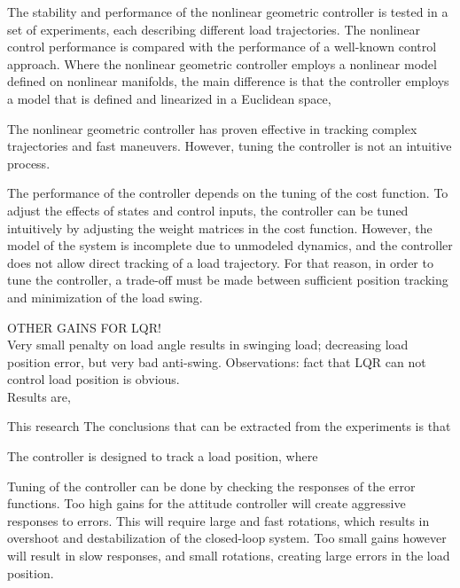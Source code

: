 The stability and performance of the nonlinear geometric controller is tested in a set of experiments, each describing different load trajectories. 
The nonlinear control performance is compared with the performance of a well-known  control approach. 
Where the nonlinear geometric controller employs a nonlinear model defined on nonlinear manifolds,
the main difference is that the  controller employs a model that is defined and linearized in a Euclidean space, 

%

The nonlinear geometric controller has proven effective in tracking complex trajectories and fast maneuvers.
However, tuning the controller is not an intuitive process. 

The performance of the  controller depends on the tuning of the cost function. 
To adjust the effects of states and control inputs, the controller can be tuned intuitively by adjusting the weight matrices in the cost function.
However, the model of the system is incomplete due to unmodeled dynamics, and the controller does not allow direct tracking of a load trajectory.
For that reason, in order to tune the  controller, a trade-off must be made between sufficient  position tracking and minimization of the load swing. 






OTHER GAINS FOR LQR!\\
Very small penalty on load angle results in swinging load; decreasing load position error, but very bad anti-swing. 
Observations: fact that LQR can not control load position is obvious.\\

Results are,

This research 
The conclusions that can be extracted from the experiments is that 

The  controller is designed to track a load position, where 

Tuning of the controller can be done by checking the responses of the error functions.
Too high gains for the  attitude controller will create aggressive responses to errors. 
This will require large and fast rotations, which results in overshoot and destabilization of the closed-loop system.
Too small gains however will result in slow responses, and small rotations, creating large errors in the load position.

